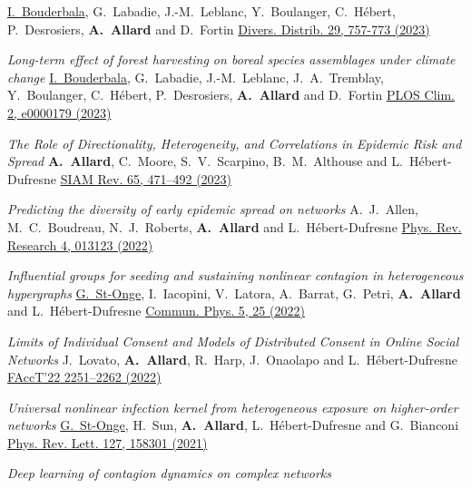 \documentclass[11pt]{article}
\makeatletter
\newcommand{\reversearabic}[1]{\expandafter\@reversearabic\csname c@#1\endcsname}
\newcommand{\@reversearabic}[1]{%
  \number\numexpr\getrefnumber{this@etaremune@\romannumeral\c@etaremune}-#1+1\relax
}
\newcounter{etaremune}
\newenvironment{etaremune}[1][]{%
  \stepcounter{etaremune}%
  \begin{enumerate}[label=\reversearabic*.,#1]%
}{%
  \edef\@currentlabel{\the\csname c@\@enumctr\endcsname}%
  \label{this@etaremune@\romannumeral\c@etaremune}%
  \end{enumerate}%
}
\makeatother
\begin{document}
\begin{etaremune}[itemsep=0.5em, label={[A\reversearabic*]}]
{  \uline{I.~Bouderbala}, G.~Labadie, J.-M.~Leblanc, Y.~Boulanger, C.~Hébert, P.~Desrosiers, \textbf{A.~Allard} and D.~Fortin\split
  \href{https://doi.org/10.1111/ddi.13697}{Divers. Distrib. 29, 757-773 (2023)}}
%
  \item \parbox[t]{\textwidth-30pt}{\textit{Long-term effect of forest harvesting on boreal species assemblages under climate change}\split
  \uline{I.~Bouderbala}, G.~Labadie, J.-M.~Leblanc, J.~A.~Tremblay, Y.~Boulanger, C.~Hébert, P.~Desrosiers, \textbf{A.~Allard} and D.~Fortin\split
  \href{https://doi.org/10.1371/journal.pclm.0000179}{PLOS Clim. 2, e0000179 (2023)}}
%
  \item \parbox[t]{\textwidth-30pt}{\textit{The Role of Directionality, Heterogeneity, and Correlations in Epidemic Risk and Spread}\split
  \textbf{A.~Allard}, C.~Moore, S.~V.~Scarpino, B.~M.~Althouse and L.~H\'ebert-Dufresne\split
  \href{https://doi.org/10.1137/20m1383811}{SIAM Rev. 65, 471--492 (2023)}}
%
  \item \parbox[t]{\textwidth-30pt}{\textit{Predicting the diversity of early epidemic spread on networks}\split
  A.~J.~Allen, M.~C.~Boudreau, N.~J.~Roberts, \textbf{A.~Allard} and L.~H\'ebert-Dufresne\split
  \href{https://doi.org/10.1103/PhysRevResearch.4.013123}{Phys. Rev. Research 4, 013123 (2022)}}
%
  \item \parbox[t]{\textwidth-30pt}{\textit{Influential groups for seeding and sustaining nonlinear contagion in heterogeneous hypergraphs}\split
  \uline{G.~St-Onge}, I.~Iacopini, V.~Latora, A.~Barrat, G.~Petri, \textbf{A.~Allard} and L.~H\'ebert-Dufresne\split
  \href{https://doi.org/10.1038/s42005-021-00788-w}{Commun. Phys. 5, 25 (2022)}}
%
  \item \parbox[t]{\textwidth-30pt}{\textit{Limits of Individual Consent and Models of Distributed Consent in Online Social Networks}\split
  J.~Lovato, \textbf{A.~Allard}, R.~Harp, J.~Onaolapo and L.~H\'ebert-Dufresne\split
  \href{https://doi.org/10.1145/3531146.3534640}{FAccT'22 2251--2262 (2022)}}
%
  \item \parbox[t]{\textwidth-30pt}{\textit{Universal nonlinear infection kernel from heterogeneous exposure on higher-order networks}\split
  \uline{G.~St-Onge}, H.~Sun, \textbf{A.~Allard}, L.~H\'ebert-Dufresne and G.~Bianconi\split
  \href{https://doi.org/10.1103/PhysRevLett.127.158301}{Phys. Rev. Lett. 127, 158301 (2021)}}
%
  \item \parbox[t]{\textwidth-30pt}{\textit{Deep learning of contagion dynamics on complex networks}\split
}
\end{etaremune}
\end{document}
